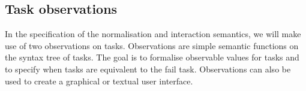 




\subsection{Task observations}

In the specification of the normalisation and interaction semantics, we will make use of two observations on tasks.
Observations are simple semantic functions on the syntax tree of tasks.
The goal is to formalise observable values for tasks
and to specify when tasks are equivalent to the fail task.
Observations can also be used to create a graphical or textual user interface.





